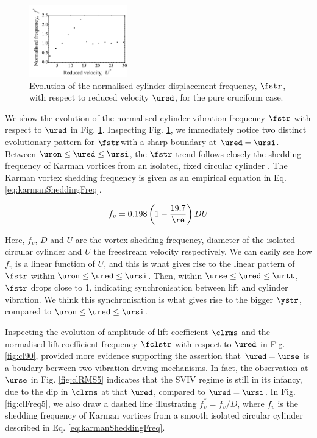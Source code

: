 \documentclass[a4paper,fleqn]{cas-sc}
\begin{document}
\begin{figure}
  \centering
  \includegraphics[width=0.38\textwidth]{figs/yStrFreq5}
  \caption{Evolution of the normalised cylinder displacement frequency, $\fstr$, with respect to reduced velocity $\ured$, for the pure cruciform case.}
  \label{fig:yStrFreq5}
\end{figure}

We show the evolution of the normalised cylinder vibration frequency $\fstr$ with respect to $\ured$ in Fig. \ref{fig:yStrFreq5}. Inspecting Fig. \ref{fig:yStrFreq5}, we immediately notice two distinct evolutionary pattern for $\fstr$with a sharp boundary at $\ured = \ursi$. Between $\uron \leq \ured \leq \ursi$, the $\fstr$ trend follows closely the shedding frequency of Karman vortices from an isolated, fixed circular cylinder \citep{Blevins1990}. The Karman vortex shedding frequency is given as an empirical equation in Eq. \ref{eq:karmanSheddingFreq}.

\begin{equation}
  f_{v} = 0.198 \left( 1 - \frac{19.7}{\re} \right) DU
  \label{eq:karmanSheddingFreq}
\end{equation}

\noindent Here, $f_{v}$, $D$ and $U$ are the vortex shedding frequency, diameter of the isolated circular cylinder and $U$ the freestream velocity respectively. We can easily see how $f_{v}$ is a linear function of $U$, and this is what gives rise to the linear pattern of $\fstr$ within $\uron \leq \ured \leq \ursi$. Then, within $\urse \leq \ured \leq \urtt$, $\fstr$ drops close to 1, indicating synchronisation between lift and cylinder vibration. We think this synchronisation is what gives rise to the bigger $\ystr$, compared to $\uron \leq \ured \leq \ursi$.

Inspecting the evolution of \rms{} amplitude of lift coefficient $\clrms$ and the normalised lift coefficient frequency $\fclstr$ with respect to $\ured$ in Fig. \ref{fig:cl90}, provided more evidence supporting the assertion that $\ured = \urse$ is a boudary berween two vibration-driving mechanisms. In fact, the observation at $\urse$ in Fig. \ref{fig:clRMS5} indicates that the SVIV regime is still in its infancy, due to the dip in $\clrms$ at that $\ured$, compared to $\ured = \ursi$. In Fig. \ref{fig:clFreq5}, we also draw a dashed line illustrating $f^{*}_{v} = f_{v}/D$, where $f_{v}$ is the shedding frequency of Karman vortices from a smooth isolated circular cylinder described in Eq. \ref{eq:karmanSheddingFreq}.
\end{document}
